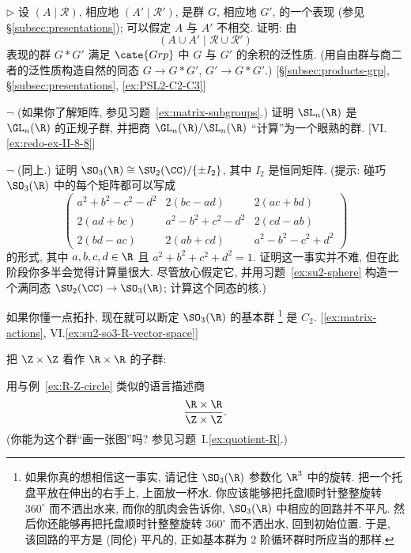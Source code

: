 \begin{prob}
\label{ex:coproduct-explicit}
$\triangleright$ 设 $(A \mid \mathcal{R})$, 相应地 $(A' \mid \mathcal{R}')$, 是群 $G$, 相应地 $G'$, 的一个表现 (参见 \S\ref{subsec:presentations}); 可以假定 $A$ 与 $A'$ 不相交. 证明: 由
\[
(A \cup A' \mid \mathcal{R} \cup \mathcal{R}')
\]
表现的群 $G * G'$ 满足 $\cate{Grp}$ 中 $G$ 与 $G'$ 的余积的泛性质. (用自由群与商二者的泛性质构造自然的同态 $G \to G * G'$, $G' \to G * G'$.) [\S\ref{subsec:products-grp}, \S\ref{subsec:presentations}, \ref{ex:PSL2-C2-C3}]
\end{prob}

\begin{prob}
\label{ex:SL-normal}
$\neg$ (如果你了解矩阵, 参见习题~\ref{ex:matrix-subgroups}.) 证明 $\SL_n(\R)$ 是 $\GL_n(\R)$ 的正规子群, 并把商 $\GL_n(\R)/\SL_n(\R)$ ``计算''为一个眼熟的群. [VI.\ref{ex:redo-ex-II-8-8}]
\end{prob}

\begin{prob}
\label{ex:SO3-SU2}
$\neg$ (同上.) 证明 $\SO_3(\R) \cong \SU_2(\CC)/\{\pm I_2\}$, 其中 $I_2$ 是恒同矩阵. (提示: 碰巧 $\SO_3(\R)$ 中的每个矩阵都可以写成
\[
\begin{pmatrix}
	a^2 + b^2 - c^2 - d^2 & 2(bc - ad) & 2(ac + bd) \\
	2(ad + bc) & a^2 - b^2 + c^2 - d^2 & 2(cd - ab) \\
	2(bd - ac) & 2(ab + cd) & a^2 - b^2 - c^2 + d^2
\end{pmatrix}
\]
的形式, 其中 $a, b, c, d \in \R$ 且 $a^2 + b^2 + c^2 + d^2 = 1$. 证明这一事实并不难, 但在此阶段你多半会觉得计算量很大. 尽管放心假定它, 并用习题~\ref{ex:su2-sphere} 构造一个满同态 $\SU_2(\CC) \to \SO_3(\R)$; 计算这个同态的核.)

如果你懂一点拓扑, 现在就可以断定 $\SO_3(\R)$ 的基本群%
\footnote{如果你真的想相信这一事实, 请记住 $\SO_3(\R)$ 参数化 $\R^3$ 中的旋转. 把一个托盘平放在伸出的右手上, 上面放一杯水. 你应该能够把托盘顺时针整整旋转 $360^{\circ}$ 而不洒出水来, 而你的肌肉会告诉你, $\SO_3(\R)$ 中相应的回路并不平凡. 然后你还能够再把托盘顺时针整整旋转 $360^{\circ}$ 而不洒出水, 回到初始位置. 于是, 该回路的平方是 (同伦) 平凡的, 正如基本群为 $2$ 阶循环群时所应当的那样.}%
是 $C_2$. [\ref{ex:matrix-actions}, VI.\ref{ex:su2-so3-R-vector-space}]
\end{prob}

\begin{prob}
\label{ex:torus}
把 $\Z \times \Z$ 看作 $\R \times \R$ 的子群:
\begin{center}
\end{center}
用与例~\ref{ex:R-Z-circle} 类似的语言描述商
\[
\frac{\R \times \R}{\Z \times \Z}.
\]
(你能为这个群``画一张图''吗? 参见习题~I.\ref{ex:quotient-R}.)
\end{prob}

